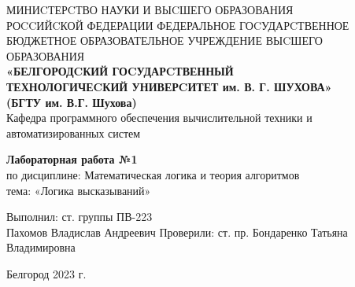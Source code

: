 \documentclass[a4paper,14pt]{extarticle}
\newcommand\textbox[1]{
	\parbox{.45\textwidth}{#1}
}
\begin{document}
\begin{center}
	\small{
		МИНИCТЕРCТВО НАУКИ И ВЫCШЕГО ОБРАЗОВАНИЯ \\РОCCИЙCКОЙ ФЕДЕРАЦИИ
		\bigbreak
		ФЕДЕРАЛЬНОЕ ГОCУДАРCТВЕННОЕ БЮДЖЕТНОЕ ОБРАЗОВАТЕЛЬНОЕ УЧРЕЖДЕНИЕ ВЫCШЕГО ОБРАЗОВАНИЯ \\
		\bigbreak
		\textbf{«БЕЛГОРОДCКИЙ ГОCУДАРCТВЕННЫЙ \\ТЕХНОЛОГИЧЕCКИЙ УНИВЕРCИТЕТ им. В. Г. ШУХОВА»\\ (БГТУ им. В.Г. Шухова)} \\
		\bigbreak
		Кафедра программного обеспечения вычислительной техники и автоматизированных систем\\}
\end{center}

\vfill
\begin{center}
	\large{
		\textbf{
			Лабораторная работа №1}}\\
	\normalsize{
		по дисциплине: Математическая логика и теория алгоритмов \\
		тема: «Логика высказываний»}
\end{center}
\vfill
\hfill\textbox{
	Выполнил: ст. группы ПВ-223\\Пахомов Владислав Андреевич
	\bigbreak
	Проверили: ст. пр. Бондаренко Татьяна \\Владимировна
}
\vfill\begin{center}
	Белгород 2023 г.
\end{center}
\end{document}
